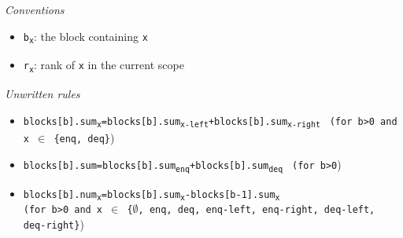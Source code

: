 \documentclass[10pt]{article}
\newcommand{\sub}[1]{\textsubscript{#1}}
\renewcommand{\tt}[1]{\texttt{#1}}
\renewcommand{\it}[1]{\textit{#1}}
\theoremstyle{definition}
\begin{document}
\begin{algorithm}
\begin{algorithmic}[1]
\begin{multicols}{2}


\end{multicols}
\end{algorithmic}
\end{algorithm}


\begin{footnotesize}
  
\it{Conventions}
\begin{itemize}
  \item \tt{b\sub{x}}: the block containing \tt{x}
  \item \tt{r\sub{x}}: rank of \tt{x} in the current scope
\end{itemize}

\it{Unwritten rules}
\begin{itemize}
 \item \tt{blocks[b].sum\sub{x}=blocks[b].sum\sub{x-left}+blocks[b].sum\sub{x-right}}  \tt{ (for b>0 and x $\in$ \{enq, deq\}})
 \item \tt{blocks[b].sum=blocks[b].sum\sub{enq}+blocks[b].sum\sub{deq}}  \tt{ (for b>0})
  \item \tt{blocks[b].num\sub{x}=blocks[b].sum\sub{x}-blocks[b-1].sum\sub{x}} \\ \tt{(for b>0 and x $\in$ \{$\emptyset$, enq, deq, enq-left, enq-right, deq-left, deq-right\}})
\end{itemize}
\end{footnotesize}



\end{document}
